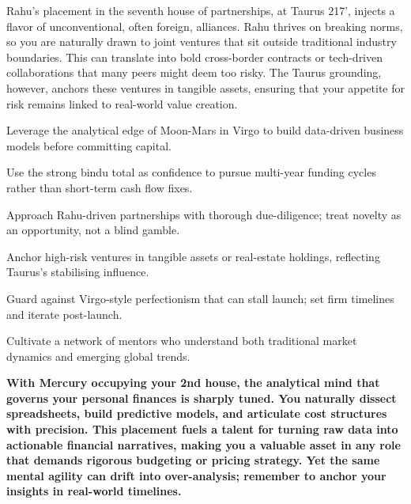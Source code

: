 {\fontsize{9}{13}\selectfont Rahu's placement in the seventh house of partnerships, at Taurus 21\textdegree{}7', injects a flavor of unconventional, often foreign, alliances. Rahu thrives on breaking norms, so you are naturally drawn to joint ventures that sit outside traditional industry boundaries. This can translate into bold cross-border contracts or tech-driven collaborations that many peers might deem too risky. The Taurus grounding, however, anchors these ventures in tangible assets, ensuring that your appetite for risk remains linked to real-world value creation.}\par\vspace{1.8mm}

\begin{diamondlist}
  \item {\fontsize{8.5}{12}\selectfont Leverage the analytical edge of Moon-Mars in Virgo to build data-driven business models before committing capital.}
  \item {\fontsize{8.5}{12}\selectfont Use the strong bindu total as confidence to pursue multi-year funding cycles rather than short-term cash flow fixes.}
  \item {\fontsize{8.5}{12}\selectfont Approach Rahu-driven partnerships with thorough due-diligence; treat novelty as an opportunity, not a blind gamble.}
  \item {\fontsize{8.5}{12}\selectfont Anchor high-risk ventures in tangible assets or real-estate holdings, reflecting Taurus's stabilising influence.}
  \item {\fontsize{8.5}{12}\selectfont Guard against Virgo-style perfectionism that can stall launch; set firm timelines and iterate post-launch.}
  \item {\fontsize{8.5}{12}\selectfont Cultivate a network of mentors who understand both traditional market dynamics and emerging global trends.}
\end{diamondlist}


\label{topic50}

{\fontsize{9.5}{13.8}\selectfont\bfseries\color{DeepSlate} With Mercury occupying your 2nd house, the analytical mind that governs your personal finances is sharply tuned. You naturally dissect spreadsheets, build predictive models, and articulate cost structures with precision. This placement fuels a talent for turning raw data into actionable financial narratives, making you a valuable asset in any role that demands rigorous budgeting or pricing strategy. Yet the same mental agility can drift into over-analysis; remember to anchor your insights in real-world timelines.}\par\vspace{2mm}

